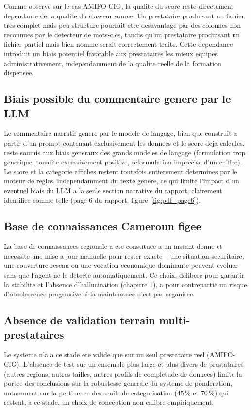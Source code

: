 \documentclass[12pt,a4paper,twoside,openany]{report}
\begin{document}
Comme observe sur le cas AMIFO-CIG, la qualite du score reste directement dependante de la qualite du classeur source. Un prestataire produisant un fichier tres complet mais peu structure pourrait etre desavantage par des colonnes non reconnues par le detecteur de mots-cles, tandis qu'un prestataire produisant un fichier partiel mais bien nomme serait correctement traite. Cette dependance introduit un biais potentiel favorable aux prestataires les mieux equipes administrativement, independamment de la qualite reelle de la formation dispensee.

\subsection{Biais possible du commentaire genere par le LLM}

Le commentaire narratif genere par le modele de langage, bien que construit a partir d'un prompt contenant exclusivement les donnees et le score deja calcules, reste soumis aux biais generaux des grands modeles de langage (formulation trop generique, tonalite excessivement positive, reformulation imprecise d'un chiffre). Le score et la categorie affiches restent toutefois entierement determines par le moteur de regles, independamment du texte genere, ce qui limite l'impact d'un eventuel biais du LLM a la seule section narrative du rapport, clairement identifiee comme telle (page 6 du rapport, figure~\ref{fig:pdf_page6}).

\subsection{Base de connaissances Cameroun figee}

La base de connaissances regionale a ete constituee a un instant donne et necessite une mise a jour manuelle pour rester exacte -- une situation securitaire, une couverture reseau ou une vocation economique dominante peuvent evoluer sans que l'agent ne le detecte automatiquement. Ce choix, delibere pour garantir la stabilite et l'absence d'hallucination (chapitre 1), a pour contrepartie un risque d'obsolescence progressive si la maintenance n'est pas organisee.

\subsection{Absence de validation terrain multi-prestataires}

Le systeme n'a a ce stade ete valide que sur un seul prestataire reel (AMIFO-CIG). L'absence de test sur un ensemble plus large et plus divers de prestataires (autres regions, autres tailles, autres profils de completude de donnees) limite la portee des conclusions sur la robustesse generale du systeme de ponderation, notamment sur la pertinence des seuils de categorisation (45\,\% et 70\,\%) qui restent, a ce stade, un choix de conception non calibre empiriquement.
\end{document}
